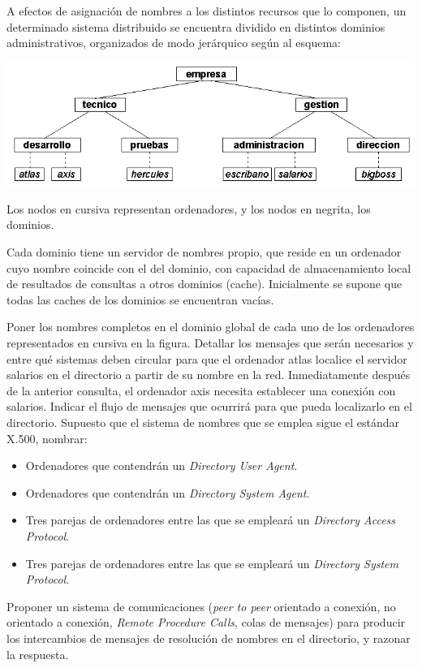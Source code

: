   \begin{problem}[12] A efectos de asignación de nombres a los distintos recursos
  que lo componen, un determinado sistema distribuido se encuentra dividido
  en distintos dominios administrativos, organizados de modo jerárquico
  según al esquema:

  \begin{center}
  \includegraphics[width=1\textwidth]{img/si2-t4-ej-dom1.png}
  \label{Subnormalidad.}
  \end{center}

  Los nodos en cursiva representan ordenadores, y los nodos en negrita, los dominios.


  Cada dominio tiene un servidor de nombres propio, que reside en un ordenador
    cuyo nombre coincide con el del dominio, con capacidad de almacenamiento local
    de resultados de consultas a otros dominios (cache). Inicialmente se supone que
    todas las caches de los dominios se encuentran vacías.

    \ppart Poner los nombres completos en el dominio global de cada uno de los
      ordenadores representados en cursiva en la figura.
    \ppart Detallar los mensajes que serán necesarios y entre qué sistemas deben
        circular para que el ordenador atlas localice el servidor salarios en el
        directorio a partir de su nombre en la red.
      \ppart Inmediatamente después de la anterior consulta, el ordenador axis necesita
          establecer una conexión con salarios. Indicar el flujo de mensajes que ocurrirá
        para que pueda localizarlo en el directorio.
      \ppart Supuesto que el sistema de nombres que se emplea sigue el estándar X.500, nombrar:
            \begin{itemize}
              \item Ordenadores que contendrán un \textit{Directory User Agent}.
              \item Ordenadores que contendrán un \textit{Directory System Agent}.
              \item Tres parejas de ordenadores entre las que se empleará un \textit{Directory Access Protocol}.
              \item Tres parejas de ordenadores entre las que se empleará un \textit{Directory System Protocol}.
            \end{itemize}
      \ppart Proponer un sistema de comunicaciones (\textit{peer to peer} orientado a conexión, no orientado a conexión, \textit{Remote Procedure Calls},
 colas de mensajes) para producir los intercambios de mensajes de
resolución de nombres en el directorio, y razonar la respuesta.



\end{problem}
